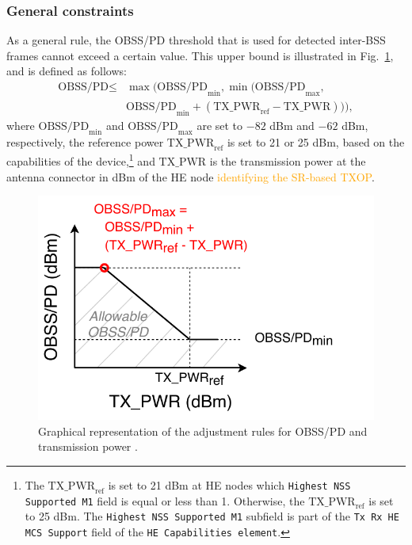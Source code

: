 \documentclass{ieeeaccess}
\begin{document}
\subsubsection{General constraints}
As a general rule, the OBSS/PD threshold that is used for detected inter-BSS frames cannot exceed a certain value. This upper bound is illustrated in Fig.~\ref{fig:fig_7}, and is defined as follows:
\begin{align}\nonumber \text{OBSS/PD} \leq & \max\Big(\text{OBSS/PD}_{\min}, \min\big(\text{OBSS/PD}_{\max},\\ & \text{OBSS/PD}_{\min} + (\text{TX\_PWR}_{\text{ref}}-\text{TX\_PWR})\big)\Big), \nonumber \end{align}
where $\text{OBSS/PD}_{\min}$ and $\text{OBSS/PD}_{\max}$ are set to $-82$ dBm and $-62$ dBm, respectively, the reference power $\text{TX\_PWR}_{\text{ref}}$ is set to 21 or 25 dBm, based on the
capabilities of the device,\footnote{The $\text{TX\_PWR}_{\text{ref}}$ is set to 21 dBm at HE nodes which \texttt{Highest NSS Supported M1} field is equal or less than 1. Otherwise, the  $\text{TX\_PWR}_{\text{ref}}$ is set to 25 dBm. The \texttt{Highest NSS Supported M1} subfield is part of the \texttt{Tx Rx HE MCS Support} field of the \texttt{HE Capabilities element}.} and $\text{TX\_PWR}$ is the transmission power at the antenna connector in dBm of the HE node \textcolor{orange}{identifying the SR-based TXOP}.
\begin{figure}[ht!]
	\centering
	\includegraphics[width=0.8\columnwidth]{fig_10}
	\caption{Graphical representation of the adjustment rules for OBSS/PD and transmission power \cite{tgax2019draft}.}
	\label{fig:fig_7}
\end{figure}
\end{document}
